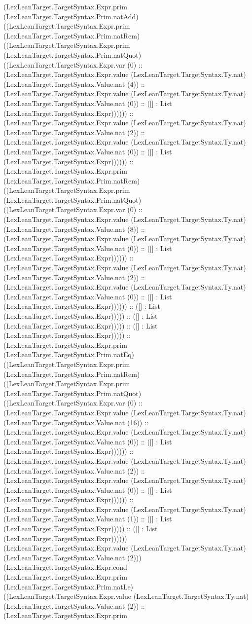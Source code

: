 \documentclass[11pt]{article}
\begin{document}
(LexLeanTarget.TargetSyntax.Expr.prim (LexLeanTarget.TargetSyntax.Prim.natAdd) ((LexLeanTarget.TargetSyntax.Expr.prim (LexLeanTarget.TargetSyntax.Prim.natRem) ((LexLeanTarget.TargetSyntax.Expr.prim (LexLeanTarget.TargetSyntax.Prim.natQuot) ((LexLeanTarget.TargetSyntax.Expr.var (0) :: (LexLeanTarget.TargetSyntax.Expr.value (LexLeanTarget.TargetSyntax.Ty.nat) (LexLeanTarget.TargetSyntax.Value.nat (4)) :: (LexLeanTarget.TargetSyntax.Expr.value (LexLeanTarget.TargetSyntax.Ty.nat) (LexLeanTarget.TargetSyntax.Value.nat (0)) :: ([] : List (LexLeanTarget.TargetSyntax.Expr)))))) :: (LexLeanTarget.TargetSyntax.Expr.value (LexLeanTarget.TargetSyntax.Ty.nat) (LexLeanTarget.TargetSyntax.Value.nat (2)) :: (LexLeanTarget.TargetSyntax.Expr.value (LexLeanTarget.TargetSyntax.Ty.nat) (LexLeanTarget.TargetSyntax.Value.nat (0)) :: ([] : List (LexLeanTarget.TargetSyntax.Expr)))))) :: (LexLeanTarget.TargetSyntax.Expr.prim (LexLeanTarget.TargetSyntax.Prim.natRem) ((LexLeanTarget.TargetSyntax.Expr.prim (LexLeanTarget.TargetSyntax.Prim.natQuot) ((LexLeanTarget.TargetSyntax.Expr.var (0) :: (LexLeanTarget.TargetSyntax.Expr.value (LexLeanTarget.TargetSyntax.Ty.nat) (LexLeanTarget.TargetSyntax.Value.nat (8)) :: (LexLeanTarget.TargetSyntax.Expr.value (LexLeanTarget.TargetSyntax.Ty.nat) (LexLeanTarget.TargetSyntax.Value.nat (0)) :: ([] : List (LexLeanTarget.TargetSyntax.Expr)))))) :: (LexLeanTarget.TargetSyntax.Expr.value (LexLeanTarget.TargetSyntax.Ty.nat) (LexLeanTarget.TargetSyntax.Value.nat (2)) :: (LexLeanTarget.TargetSyntax.Expr.value (LexLeanTarget.TargetSyntax.Ty.nat) (LexLeanTarget.TargetSyntax.Value.nat (0)) :: ([] : List (LexLeanTarget.TargetSyntax.Expr)))))) :: ([] : List (LexLeanTarget.TargetSyntax.Expr))))) :: ([] : List (LexLeanTarget.TargetSyntax.Expr))))) :: ([] : List (LexLeanTarget.TargetSyntax.Expr))))) :: (LexLeanTarget.TargetSyntax.Expr.prim (LexLeanTarget.TargetSyntax.Prim.natEq) ((LexLeanTarget.TargetSyntax.Expr.prim (LexLeanTarget.TargetSyntax.Prim.natRem) ((LexLeanTarget.TargetSyntax.Expr.prim (LexLeanTarget.TargetSyntax.Prim.natQuot) ((LexLeanTarget.TargetSyntax.Expr.var (0) :: (LexLeanTarget.TargetSyntax.Expr.value (LexLeanTarget.TargetSyntax.Ty.nat) (LexLeanTarget.TargetSyntax.Value.nat (16)) :: (LexLeanTarget.TargetSyntax.Expr.value (LexLeanTarget.TargetSyntax.Ty.nat) (LexLeanTarget.TargetSyntax.Value.nat (0)) :: ([] : List (LexLeanTarget.TargetSyntax.Expr)))))) :: (LexLeanTarget.TargetSyntax.Expr.value (LexLeanTarget.TargetSyntax.Ty.nat) (LexLeanTarget.TargetSyntax.Value.nat (2)) :: (LexLeanTarget.TargetSyntax.Expr.value (LexLeanTarget.TargetSyntax.Ty.nat) (LexLeanTarget.TargetSyntax.Value.nat (0)) :: ([] : List (LexLeanTarget.TargetSyntax.Expr)))))) :: (LexLeanTarget.TargetSyntax.Expr.value (LexLeanTarget.TargetSyntax.Ty.nat) (LexLeanTarget.TargetSyntax.Value.nat (1)) :: ([] : List (LexLeanTarget.TargetSyntax.Expr))))) :: ([] : List (LexLeanTarget.TargetSyntax.Expr)))))) (LexLeanTarget.TargetSyntax.Expr.value (LexLeanTarget.TargetSyntax.Ty.nat) (LexLeanTarget.TargetSyntax.Value.nat (2))) (LexLeanTarget.TargetSyntax.Expr.cond (LexLeanTarget.TargetSyntax.Expr.prim (LexLeanTarget.TargetSyntax.Prim.natLe) ((LexLeanTarget.TargetSyntax.Expr.value (LexLeanTarget.TargetSyntax.Ty.nat) (LexLeanTarget.TargetSyntax.Value.nat (2)) :: (LexLeanTarget.TargetSyntax.Expr.prim 
\end{document}
